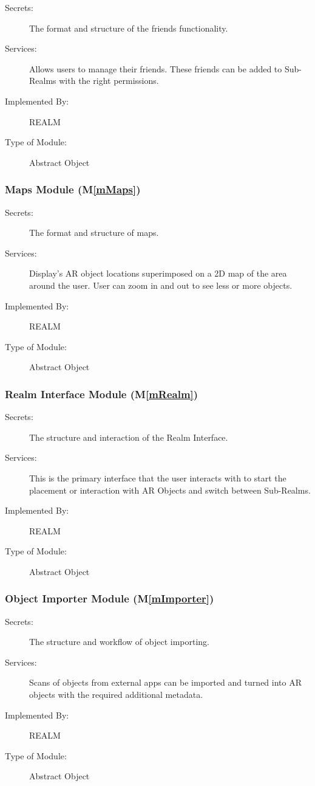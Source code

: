 \documentclass[12pt, titlepage]{article}
\newcommand{\mref}[1]{M\ref{#1}}
\begin{document}
\begin{description}
\item[Secrets:]The format and structure of the friends functionality.
\item[Services:]Allows users to manage their friends. These friends can be added to Sub-Realms with the right permissions.
\item[Implemented By:]REALM
\item[Type of Module:]Abstract Object
\end{description}

\subsubsection{Maps Module (\mref{mMaps})}

\begin{description}
\item[Secrets:]The format and structure of maps.
\item[Services:]Display's AR object locations superimposed on a 2D map of the area around the user. User can zoom in and out to see less or more objects.
\item[Implemented By:]REALM
\item[Type of Module:]Abstract Object
\end{description}

\subsubsection{Realm Interface Module (\mref{mRealm})}

\begin{description}
\item[Secrets:]The structure and interaction of the Realm Interface.
\item[Services:]This is the primary interface that the user interacts with to start the placement or interaction with AR Objects and switch between Sub-Realms.
\item[Implemented By:]REALM
\item[Type of Module:]Abstract Object
\end{description}

\subsubsection{Object Importer Module (\mref{mImporter})}

\begin{description}
\item[Secrets:]The structure and workflow of object importing.
\item[Services:]Scans of objects from external apps can be imported and turned into AR objects with the required additional metadata.
\item[Implemented By:]REALM
\item[Type of Module:]Abstract Object
\end{description}
\end{document}

